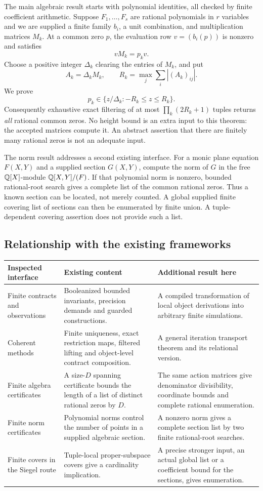 The main algebraic result starts with polynomial identities, all checked
by finite coefficient arithmetic. Suppose $F_1,\ldots,F_s$ are rational
polynomials in $r$ variables and we are supplied a finite family $b_i$,
a unit combination, and multiplication matrices $M_k$. At a common
zero $p$, the evaluation row $v=(b_i(p))$ is nonzero and satisfies
\[
                           vM_k=p_kv.
\]
Choose a positive integer $\Delta_k$ clearing the entries of $M_k$,
and put
\[
 A_k=\Delta_kM_k,\qquad
 R_k=\max_j\sum_i |(A_k)_{ij}|.
\]
We prove
\[
             p_k\in\{z/\Delta_k:-R_k\le z\le R_k\}.
\]
Consequently exhaustive exact filtering of at most
$\prod_k(2R_k+1)$ tuples returns \emph{all} rational common zeros.
No height bound is an extra input to this theorem: the accepted matrices
compute it. An abstract assertion that there are finitely many rational
zeros is not an adequate input.

The norm result addresses a second existing interface. For a monic plane
equation $F(X,Y)$ and a supplied section $G(X,Y)$, compute the norm of
$G$ in the free $\mathbb Q[X]$-module $\mathbb Q[X,Y]/(F)$. If that polynomial
norm is nonzero, bounded rational-root search gives a complete list of
the common rational zeros. Thus a known section can be located, not
merely counted. A global supplied finite covering list of sections can
then be enumerated by finite union. A tuple-dependent covering assertion
does not provide such a list.

\subsection{Relationship with the existing frameworks}

\begin{longtable}{P{.23\linewidth}P{.34\linewidth}P{.33\linewidth}}
\toprule
Inspected interface & Existing content & Additional result here\\
\midrule\endhead
Finite contracts and observations & Booleanized bounded invariants,
precision demands and guarded constructions. & A compiled transformation
of local object derivations into arbitrary finite simulations.\\[4pt]
Coherent methods & Finite uniqueness, exact restriction maps, filtered
lifting and object-level contract composition. & A general iteration
transport theorem and its relational version.\\[4pt]
Finite algebra certificates & A size-$D$ spanning certificate bounds
the length of a list of distinct rational zeros by $D$. & The same
action matrices give denominator divisibility, coordinate bounds and
complete rational enumeration.\\[4pt]
Finite norm certificates & Polynomial norms control the number of
points in a supplied algebraic section. & A nonzero norm gives a
complete section list by two finite rational-root searches.\\[4pt]
Finite covers in the Siegel route & Tuple-local proper-subspace covers
give a cardinality implication. & A precise stronger input, an actual
global list or a coefficient bound for the sections, gives enumeration.\\
\bottomrule
\end{longtable}

